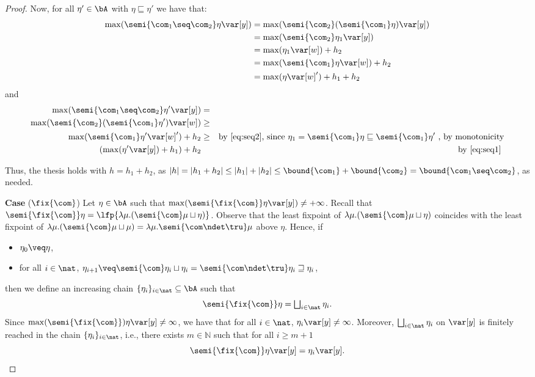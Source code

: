 \begin{proof}
  Now, for all \(\eta' \in \bA\) with \(\eta \sqsubseteq \eta'\) we have that:
  \begin{align*}
    \max(\semi{\com_1 \seq \com_2}\eta \var[y])
    &= \max(\semi{\com_2}(\semi{\com_1}\eta) \var[y])\\
    & = \max(\semi{\com_2}\eta_1 \var[y])\\
    & = \max(\eta_1 \var[w]) + h_2\\
    & = \max(\semi{\com_1}\eta \var[w]) + h_2\\
    & = \max(\eta \var[w]')+h_1 + h_2
  \end{align*}
  and
  \begin{align*}
    \max(\semi{\com_1 \seq \com_2}\eta' \var[y]) & = & \\ 
    \max(\semi{\com_2}(\semi{\com_1}\eta') \var[w]) & \geq & \\ 
    \max(\semi{\com_1}\eta' \var[w]') + h_2 & \geq & 
    \text{by \eqref{eq:seq2}, since } \eta_1 = \semi{\com_1}\eta \sqsubseteq \semi{\com_1}\eta' \text{ , by monotonicity} \\
    (\max(\eta' \var[y]) +h_1) + h_2 & & \text{by \eqref{eq:seq1}}\
  \end{align*}

  Thus, the thesis holds with \(h= h_1+h_2\), as
  \(|h| =|h_1 +h_2| \leq |h_1| + |h_2| \leq \bound{\com_1} +
  \bound{\com_2} = \bound{\com_1 \seq \com_2}\), as needed.

  
  \medskip
  
  \noindent
  \textbf{Case} (\(\fix{\com}\)) 
  Let \(\eta \in \bA\) such that
  \(\max(\semi{\fix{\com}} \eta \var[y]) \neq + \infty\). Recall that
  \(\semi{\fix{\com}} \eta = \lfp{\lambda \mu. (\semi{\com} \mu
    \sqcup\eta)}\). Observe that the least fixpoint of
  \(\lambda \mu. (\semi{\com} \mu \sqcup\eta)\) coincides with the
  least fixpoint of
  \(\lambda \mu. (\semi{\com} \mu \sqcup \mu) = \lambda \mu. \semi{
    \com\ndet \tru} \mu\) above \(\eta\). Hence, if
  \begin{itemize}
  \item \(\eta_0 \veq \eta\),
  \item for all \(i\in \nat\),
    \(\eta_{i+1} \veq \semi{\com} \eta_i \sqcup \eta_i= \semi{\com \ndet
    \tru} \eta_i \sqsupseteq \eta_i\),
  \end{itemize}
  then we define an increasing chain \(\{\eta_i\}_{i\in \nat}\subseteq \bA\) such that
  \[ 
  \semi{\fix{\com}} \eta = \textstyle\bigsqcup_{i \in \nat} \eta_i.
  \]
  Since \(\max(\semi{\fix{\com}}) \eta \var[y] \neq \infty\), we have that
  for all \(i\in \nat\), \(\eta_i \var[y] \neq \infty\). Moreover,
  \(\textstyle\bigsqcup_{i \in \nat} \eta_i\) on \(\var[y]\) is
  finitely reached in the chain \(\{\eta_i\}_{i\in \nat}\), i.e.,
  there exists \(m \in \mathbb{N}\) such that for all \(i \geq m+1\)
  \[
  \semi{\fix{\com}} \eta \var[y] = \eta_{i} \var[y].
  \]


\end{proof}

